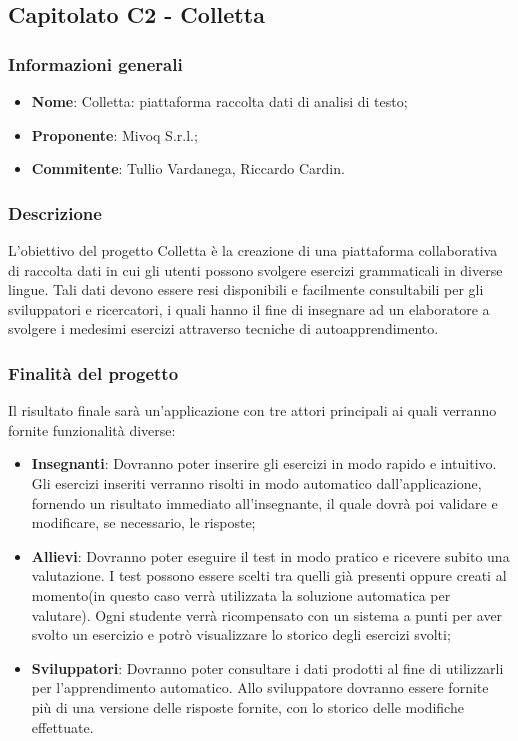 \subsection{Capitolato C2 - Colletta} 
\subsubsection{Informazioni generali}
\begin{itemize}
	\item \textbf{Nome}: Colletta: piattaforma raccolta dati di analisi di testo;
	\item \textbf{Proponente}: Mivoq S.r.l.;
	\item \textbf{Commitente}: Tullio Vardanega, Riccardo Cardin.
\end{itemize}
\subsubsection{Descrizione}
L'obiettivo del progetto Colletta è la creazione di una piattaforma collaborativa di raccolta dati in cui gli utenti possono svolgere esercizi grammaticali in diverse lingue. Tali dati devono essere resi disponibili e facilmente consultabili per gli sviluppatori e ricercatori, i quali hanno il fine di insegnare ad un elaboratore a svolgere i medesimi esercizi attraverso tecniche di autoapprendimento.
\subsubsection{Finalità del progetto}
Il risultato finale sarà un'applicazione con tre attori principali ai quali verranno fornite funzionalità diverse:
\begin{itemize}
	\item \textbf{Insegnanti}: Dovranno poter inserire gli esercizi in modo rapido e intuitivo. Gli esercizi inseriti verranno risolti in modo automatico dall'applicazione, fornendo un risultato immediato all'insegnante, il quale dovrà poi validare e modificare, se necessario, le risposte;
	\item \textbf{Allievi}: Dovranno poter eseguire il test in modo pratico e ricevere subito una valutazione. I test possono essere scelti tra quelli già presenti oppure creati al momento(in questo caso verrà utilizzata la soluzione automatica per valutare). Ogni studente verrà ricompensato con un sistema a punti per aver svolto un esercizio e potrò visualizzare lo storico degli esercizi svolti;
	\item \textbf{Sviluppatori}: Dovranno poter consultare i dati prodotti al fine di utilizzarli per l'apprendimento automatico. Allo sviluppatore dovranno essere fornite più di una versione delle risposte fornite, con lo storico delle modifiche effettuate.
\end{itemize}
